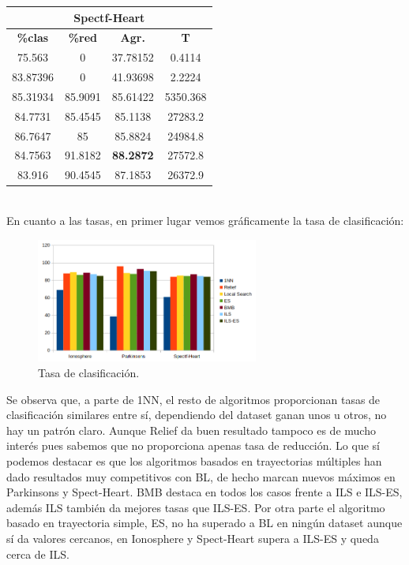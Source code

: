 \documentclass[11pt,a4paper]{article}
\theoremstyle{definition}
\begin{document}
\begin{tabbing}
{\begin{tabular}{|c|c|c|c|}
		\end{tabular}
		
		\begin{tabular}{|c|c|c|c|}
			\hline
			\multicolumn{4}{|c|}{\textbf{Spectf-Heart}} \\ \hline
			\textbf{\%clas} & \textbf{\%red} & \textbf{Agr.} & \textbf{T} \\ \hline 
			75.563	  &0	      &37.78152	&0.4114\\ \hline
83.87396	&0	      &41.93698	&2.2224\\ \hline
85.31934	&85.9091	&85.61422	&5350.368\\ \hline
84.7731 & 85.4545 & 85.1138 & 27283.2 \\ \hline
86.7647 & 85 & 85.8824 & 24984.8 \\ \hline
84.7563 & 91.8182 & \textbf{88.2872} & 27572.8 \\ \hline
83.916 & 90.4545 & 87.1853 & 26372.9 \\ \hline

		\end{tabular}
		}
	\end{tabbing}~\\
	
	
		En cuanto a las tasas, en primer lugar vemos gráficamente la tasa de clasificación:
	
	\begin{figure}[H]
		\centering
		\includegraphics[width=0.65\textwidth]{images/tasa_clas.png}
		\caption{Tasa de clasificación.}
	\end{figure}

	Se observa que, a parte de 1NN, el resto de algoritmos proporcionan tasas de clasificación similares entre sí, dependiendo del dataset ganan unos u otros, no hay un patrón claro. Aunque Relief da buen resultado tampoco es de mucho interés pues sabemos que no proporciona apenas tasa de reducción. Lo que sí podemos destacar es que los algoritmos basados en trayectorias múltiples han dado resultados muy competitivos con BL, de hecho marcan nuevos máximos en Parkinsons y Spect-Heart. BMB destaca en todos los casos frente a ILS e ILS-ES, además ILS también da mejores tasas que ILS-ES. Por otra parte el algoritmo basado en trayectoria simple, ES, no ha superado a BL en ningún dataset aunque sí da valores cercanos, en Ionosphere y Spect-Heart supera a ILS-ES y queda cerca de ILS.~\\
	
\end{document}
